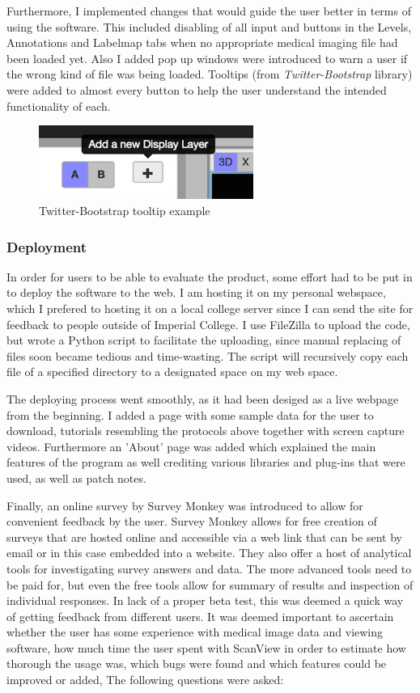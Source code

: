 \documentclass[a4paper,11pt,twoside]{article}
\begin{document}
Furthermore, I implemented changes that would guide the user better in terms of using the software. This included disabling of all input and buttons in the Levels, Annotations and Labelmap tabs when no appropriate medical imaging file had been loaded yet. Also I added pop up windows were introduced to warn a user if the wrong kind of file was being loaded. Tooltips (from \textit{Twitter-Bootstrap} library) were added to almost every button to help the user understand the intended functionality of each.


\begin{figure}[ht!]
\centering
\includegraphics[width=70mm]{graphics/tooltipExample_01.png}
\caption{Twitter-Bootstrap tooltip example}
\label{fig:UIdesign1}
\end{figure}


\subsubsection{Deployment}


In order for users to be able to evaluate the product, some effort had to be put in to deploy the software to the web. I am hosting it on my personal webspace, which I prefered to hosting it on a local college server since I can send the site for feedback to people outside of Imperial College. I use FileZilla to upload the code, but wrote a Python script to facilitate the uploading, since manual replacing of files soon became tedious and time-wasting. The script will recursively copy each file of a specified directory to a designated space on my web space.

The deploying process went smoothly, as it had been desiged as a live webpage from the beginning. I added a page with some sample data for the user to download, tutorials resembling the protocols above together with screen capture videos. Furthermore an 'About' page was added which explained the main features of the program as well crediting various libraries and plug-ins that were used, as well as patch notes. 

Finally, an online survey by Survey Monkey was introduced to allow for convenient feedback by the user. Survey Monkey allows for free creation of surveys that are hosted online and accessible via a web link that can be sent by email or in this case embedded into a website. They also offer a host of analytical tools for investigating survey answers and data. The more advanced tools need to be paid for, but even the free tools allow for summary of results and inspection of individual responses. In lack of a proper beta test, this was deemed a quick way of getting feedback from different users. It was deemed important to ascertain whether the user has some experience with medical image data and viewing software, how much time the user spent with ScanView in order to estimate how thorough the usage was, which bugs were found and which features could be improved or added, The following questions were asked:
\end{document}
